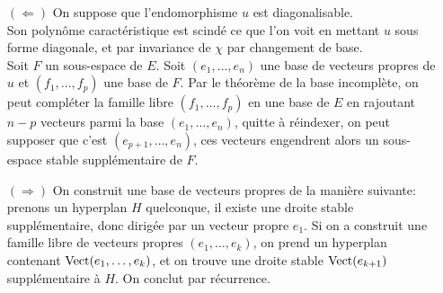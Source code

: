 \begin{preuve}
    \begin{itemize}
        \item[$(\Leftarrow)$] On suppose que l'endomorphisme $u$ est diagonalisable. \\
        Son polynôme caractéristique est scindé ce que l'on voit en mettant $u$ sous forme diagonale, et par invariance de $\chi$ par changement de base. \\
        Soit $F$ un sous-espace de $E$. Soit $(e_1, \dots, e_n)$ une base de vecteurs propres de $u$ et $(f_1, \dots, f_p)$ une base de $F$. Par le théorème de la base incomplète, on peut compléter la famille libre $(f_1, \dots, f_p)$ en une base de $E$ en rajoutant $n-p$ vecteurs parmi la base $(e_1, \dots, e_n)$, quitte à réindexer, on peut supposer que c'est $(e_{p+1}, \dots, e_n)$, ces vecteurs engendrent alors un sous-espace stable supplémentaire de $F$.
        \item[$(\Rightarrow)$] On construit une base de vecteurs propres de la manière suivante: prenons un hyperplan $H$ quelconque, il existe une droite stable supplémentaire, donc dirigée par un vecteur propre $e_1$. Si on a construit une famille libre de vecteurs propres $(e_1, \dots, e_k)$, on prend un hyperplan contenant $\mathrm{Vect}(e_1, \dots, e_k)$, et on trouve une droite stable $\mathrm{Vect}(e_{k+1})$ supplémentaire à $H$. On conclut par récurrence.
    \end{itemize}
\end{preuve}

